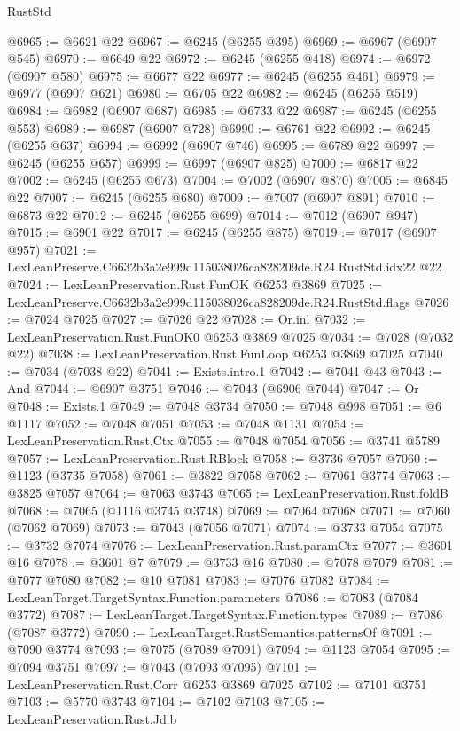 \begin{lexlean}{RustStd}
\begin{coremodule}
@6965 := @6621 @22
@6967 := @6245 (@6255 @395)
@6969 := @6967 (@6907 @545)
@6970 := @6649 @22
@6972 := @6245 (@6255 @418)
@6974 := @6972 (@6907 @580)
@6975 := @6677 @22
@6977 := @6245 (@6255 @461)
@6979 := @6977 (@6907 @621)
@6980 := @6705 @22
@6982 := @6245 (@6255 @519)
@6984 := @6982 (@6907 @687)
@6985 := @6733 @22
@6987 := @6245 (@6255 @553)
@6989 := @6987 (@6907 @728)
@6990 := @6761 @22
@6992 := @6245 (@6255 @637)
@6994 := @6992 (@6907 @746)
@6995 := @6789 @22
@6997 := @6245 (@6255 @657)
@6999 := @6997 (@6907 @825)
@7000 := @6817 @22
@7002 := @6245 (@6255 @673)
@7004 := @7002 (@6907 @870)
@7005 := @6845 @22
@7007 := @6245 (@6255 @680)
@7009 := @7007 (@6907 @891)
@7010 := @6873 @22
@7012 := @6245 (@6255 @699)
@7014 := @7012 (@6907 @947)
@7015 := @6901 @22
@7017 := @6245 (@6255 @875)
@7019 := @7017 (@6907 @957)
@7021 := LexLeanPreserve.C6632b3a2e999d115038026ca828209de.R24.RustStd.idx22 @22
@7024 := LexLeanPreservation.Rust.FunOK @6253 @3869
@7025 := LexLeanPreserve.C6632b3a2e999d115038026ca828209de.R24.RustStd.flags
@7026 := @7024 @7025
@7027 := @7026 @22
@7028 := Or.inl
@7032 := LexLeanPreservation.Rust.FunOK0 @6253 @3869 @7025
@7034 := @7028 (@7032 @22)
@7038 := LexLeanPreservation.Rust.FunLoop @6253 @3869 @7025
@7040 := @7034 (@7038 @22)
@7041 := Exists.intro.{1}
@7042 := @7041 @43
@7043 := And
@7044 := @6907 @3751
@7046 := @7043 (@6906 @7044)
@7047 := Or
@7048 := Exists.{1}
@7049 := @7048 @3734
@7050 := @7048 @998
@7051 := @6 @1117
@7052 := @7048 @7051
@7053 := @7048 @1131
@7054 := LexLeanPreservation.Rust.Ctx
@7055 := @7048 @7054
@7056 := @3741 @5789
@7057 := LexLeanPreservation.Rust.RBlock
@7058 := @3736 @7057
@7060 := @1123 (@3735 @7058)
@7061 := @3822 @7058
@7062 := @7061 @3774
@7063 := @3825 @7057
@7064 := @7063 @3743
@7065 := LexLeanPreservation.Rust.foldB
@7068 := @7065 (@1116 @3745 @3748)
@7069 := @7064 @7068
@7071 := @7060 (@7062 @7069)
@7073 := @7043 (@7056 @7071)
@7074 := @3733 @7054
@7075 := @3732 @7074
@7076 := LexLeanPreservation.Rust.paramCtx
@7077 := @3601 @16
@7078 := @3601 @7
@7079 := @3733 @16
@7080 := @7078 @7079
@7081 := @7077 @7080
@7082 := @10 @7081
@7083 := @7076 @7082
@7084 := LexLeanTarget.TargetSyntax.Function.parameters
@7086 := @7083 (@7084 @3772)
@7087 := LexLeanTarget.TargetSyntax.Function.types
@7089 := @7086 (@7087 @3772)
@7090 := LexLeanTarget.RustSemantics.patternsOf
@7091 := @7090 @3774
@7093 := @7075 (@7089 @7091)
@7094 := @1123 @7054
@7095 := @7094 @3751
@7097 := @7043 (@7093 @7095)
@7101 := LexLeanPreservation.Rust.Corr @6253 @3869 @7025
@7102 := @7101 @3751
@7103 := @5770 @3743
@7104 := @7102 @7103
@7105 := LexLeanPreservation.Rust.Jd.b

\end{coremodule}
\end{lexlean}

